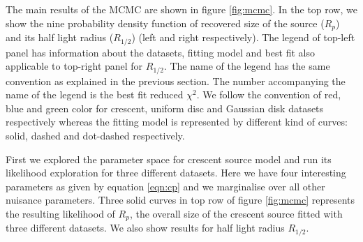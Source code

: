 The main results of the MCMC are shown in figure \ref{fig:mcmc}. In the top row, we show the nine probability density function of recovered size of the source ($R_p$) and its half light radius ($R_{1/2}$) (left and right respectively). The legend of top-left panel has information about the datasets, fitting model and best fit also applicable to top-right panel for $R_{1/2}$. The name of the legend has the same convention as explained in the previous section. The number accompanying the name of the legend is the best fit reduced $\chi^2$. We follow the convention of red, blue and green color for crescent, uniform disc and Gaussian disk datasets respectively whereas the fitting model is represented by different kind of curves: solid, dashed and dot-dashed respectively.



First we explored the parameter space for crescent source model and run its likelihood exploration for three different datasets. Here we have four interesting parameters as given by equation \ref{eqn:cp} and we marginalise over all other nuisance parameters. Three solid curves in top row of figure \ref{fig:mcmc} represents the resulting likelihood of $R_p$, the overall size of the crescent source fitted with three different datasets. We also show results for half light radius $R_{1/2}$.

